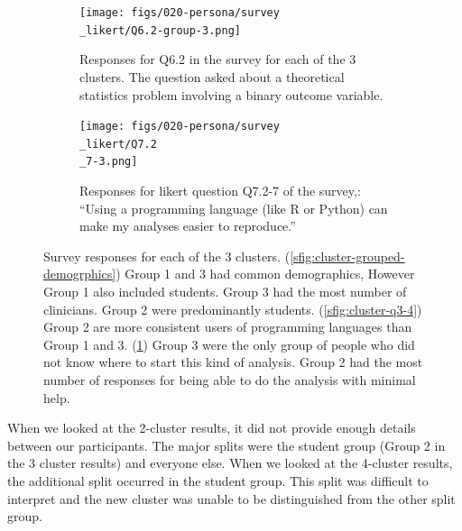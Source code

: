 \documentclass[020-persona\_validation.tex]{subfiles}
\begin{document}
\begin{figure}[htb]
            \begin{subfigure}[h]{0.45\textwidth}
                \centering
                \texttt{[image: figs/020-persona/survey\\\_likert/Q6.2-group-3.png]}
                \caption[Statistics question for logistic regression (Q6.2) for 3 clusters]
                {Responses for Q6.2 in the survey for each of the 3 clusters.
                    The question asked about a theoretical statistics problem involving a binary outcome variable.
                }
                \label{sfig:cluster-q6-2}
            \end{subfigure}
            \begin{subfigure}[h]{0.45\textwidth}
                \centering
                \texttt{[image: figs/020-persona/survey\\\_likert/Q7.2\\\_7-3.png]}
                \caption[Data programming Q7.2-7 for 3 clusters.]
                {Responses for likert question Q7.2-7 of the survey,:
                    ``Using a programming language (like R or Python) can make my analyses easier to reproduce.''
                }
                \label{sfig:cluster-q7-2-7}
            \end{subfigure}
            \caption[Selected survey questions for 3 clusters]
            {Survey responses for each of the 3 clusters.
                (\ref{sfig:cluster-grouped-demogrphics})
                Group 1 and 3 had common demographics, However Group 1 also included students.
                Group 3 had the most number of clinicians.
                Group 2 were predominantly students.
                (\ref{sfig:cluster-q3-4})
                Group 2 are more consistent users of programming languages than Group 1 and 3.
                (\ref{sfig:cluster-q6-2})
                Group 3 were the only group of people who did not know where to start this kind of analysis.
                Group 2 had the most number of responses for being able to do the analysis with minimal help.
            }
            \label{fig:cluster-results}
        \end{figure}

        When we looked at the 2-cluster results,
        it did not provide enough details between our participants.
        The major splits were the student group (Group 2 in the 3 cluster results) and everyone else.
        When we looked at the 4-cluster results,
        the additional split occurred in the student group.
        This split was difficult to interpret and the new cluster was unable to be distinguished from the other split group.
\end{document}
